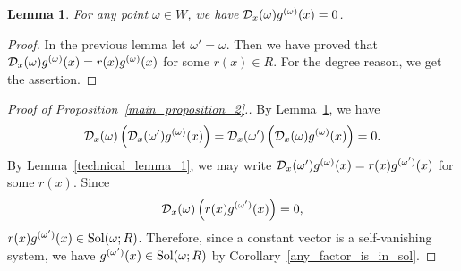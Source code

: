 \documentclass[12pt]{article}
\newtheorem{lemma}[theorem]{Lemma}
\theoremstyle{definition}
\theoremstyle{remark}
\def\cD{{\cal D}}
\def\sol{{\rm Sol}}
\def\om{\omega}
\begin{document}
\begin{lemma}   \label{technical_lemma_2}   %
For any point $\omega \in W$, we have $\cD_x(\omega)g^{(\omega)}(x)=0$. 
\end{lemma}


\begin{proof}
In the previous lemma let $\om ' = \om$.  Then we have proved that $\cD_x(\omega)g^{(\omega)}(x)=r(x) g^{(\omega)}(x)$ 
for some $r(x) \in R$. For the degree reason, we get the assertion.
\end{proof}

\begin{proof}[Proof of Proposition~\ref{main_proposition_2}.] 
By Lemma~\ref{technical_lemma_2}, we have 
\[\cD_x(\omega) \left(\cD_x(\omega ')g^{(\omega)}(x)\right)
=\cD_x(\omega ')\left( \cD_x(\omega)g^{(\omega)}(x)  \right)=0.\]
By Lemma~\ref{technical_lemma_1}, we may write  $\cD_x(\omega ')g^{(\omega)}(x)=r(x)g^{(\om ')}(x)$
for some $r(x)$.  Since 
\[\cD_x(\omega)\left( r(x)g^{(\omega ')} (x) \right) =0,    \]
$r(x)g^{(\omega ')}(x) \in \sol(\omega; R)$.  Therefore, since a constant vector is a 
self-vanishing system, we have $g^{(\omega ')}(x) \in \sol(\omega; R)$ by  Corollary~\ref{any_factor_is_in_sol}. 
\end{proof}
\end{document}
